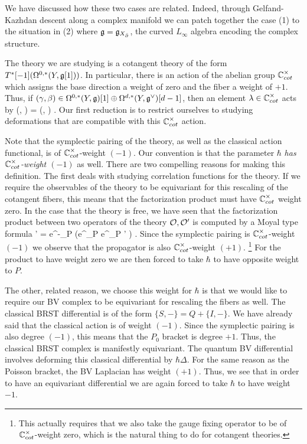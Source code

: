 \documentclass[10pt]{amsart}
\begin{document}
We have discussed how these two cases are related.
Indeed, through Gelfand-Kazhdan descent along a complex manifold we can patch together the case (1) to the situation in (2) where $\mathfrak g = \mathfrak g_{X_{\Bar{\partial}}}$, the curved $L_\infty$ algebra encoding the complex structure. 

The theory we are studying is a cotangent theory of the form $T^*[-1] (\Omega^{0,*}(Y, \mathfrak g[1]))$. 
In particular, there is an action of the abelian group $\mathbb C^\times_{cot}$ which assigns the base direction a weight of zero and the fiber a weight of $+1$. 
Thus, if $(\gamma, \beta) \in \Omega^{0,*}(Y, \mathfrak g) [1] \oplus \Omega^{d,*}(Y, \mathfrak g^\vee)[d-1]$, then an element $\lambda \in \mathbb C^\times_{cot}$ acts by
\ben
\lambda \cdot (\gamma, \beta) = (\gamma, \lambda \beta) .
\een
Our first reduction is to restrict ourselves to studying deformations that are compatible with this $\mathbb C^\times_{cot}$ action.

Note that the symplectic pairing of the theory, as well as the classical action functional, is of $\mathbb C^{\times}_{cot}$-weight $(-1)$.
Our convention is that the parameter $\hbar$ {\em has $\mathbb C^\times_{cot}$-weight $(-1)$} as well. 
There are two compelling reasons for making this definition. 
The first deals with studying correlation functions for the theory. 
If we require the observables of the theory to be equivariant for this rescaling of the cotangent fibers, this means that the factorization product must have $\mathbb C^\times_{cot}$ weight zero.
In the case that the theory is free, we have seen that the factorization product between two operators of the theory $\mathcal O, \mathcal O'$ is computed by a Moyal type formula
\ben
\cO \star \cO' = e^{-\hbar \partial_P} \left(e^{\hbar \partial_P} \cO \cdot e^{\hbar \partial_P} \cO' \right) .
\een
Since the symplectic pairing is $\mathbb C^\times_{cot}$-weight $(-1)$ we observe that the propagator is also $\mathbb C^\times_{cot}$-weight $(+1)$.
\footnote{This actually requires that we also take the gauge fixing operator to be of $\mathbb C^\times_{cot}$-weight zero, which is the natural thing to do for cotangent theories.}
For the product to have weight zero we are then forced to take $\hbar$ to have opposite weight to $P$.

The other, related reason, we choose this weight for $\hbar$ is that we would like to require our BV complex to be equivariant for rescaling the fibers as well. 
The classical BRST differential is of the form $\{S,-\} = Q + \{I,-\}$.
We have already said that the classical action is of weight $(-1)$.
Since the symplectic pairing is also degree $(-1)$, this means that the $P_0$ bracket is degree $+1$. 
Thus, the classical BRST complex is manifestly equivariant.
The quantum BV differential involves deforming this classical differential by $\hbar \Delta$. 
For the same reason as the Poisson bracket, the BV Laplacian has weight $(+1)$. 
Thus, we see that in order to have an equivariant differential we are again forced to take $\hbar$ to have weight $-1$. 
\end{document}
